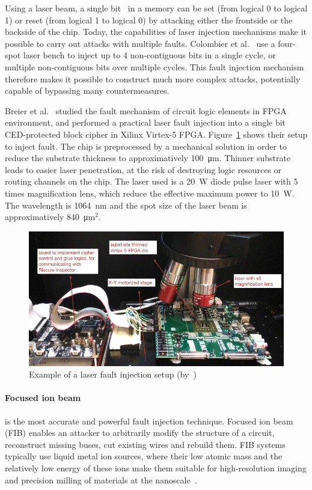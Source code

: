 Using a laser beam, a single bit~\cite{CMDMRD-19-host} in a memory can be set (from logical 0 to logical 1) or reset (from logical 1 to logical 0) by attacking either the frontside or the backside of the chip.
Today, the capabilities of laser injection mechanisms make it possible to carry out attacks with multiple faults.
Colombier et al.~\cite{CGVCBLC-22-cardis} use a four-spot laser bench to inject up to 4 non-contiguous bits in a single cycle, or multiple non-contiguous bits over multiple cycles. This fault injection mechanism therefore makes it possible to construct much more complex attacks, potentially capable of bypassing many countermeasures.

Breier et al.~\cite{JHJBC-17-hss} studied the fault mechanism of circuit logic elements in FPGA environment, and performed a practical laser fault injection into a single bit CED-protected block cipher in Xilinx Virtex-5 FPGA.
Figure~\ref{fig:lfi_setup} shows their setup to inject fault.
The chip is preprocessed by a mechanical solution in order to reduce the substrate thickness to approximatively \SI{100}{\micro\metre}. Thinner substrate leads to easier laser penetration, at the risk of destroying logic resources or routing channels on the chip.
The laser used is a \SI{20}{\watt} diode pulse laser with 5 times magnification lens, which reduce the effective maximum power to \SI{10}{\watt}. The wavelength is \SI{1064}{\nano\metre} and the spot size of the laser beam is approximatively \SI{840}{\micro\metre}$^2$.

\begin{figure}[ht]
    \centering
    \includegraphics[width=\textwidth]{c2_soa/img/lfi_setup.png}
    \caption{Example of a laser fault injection setup (by~\cite{JHJBC-17-hss})}
    \label{fig:lfi_setup}
\end{figure}

\paragraph{Focused ion beam} is the most accurate and powerful fault injection technique. Focused ion beam (FIB) enables an attacker to arbitrarily modify the structure of a circuit, reconstruct missing buses, cut existing wires and rebuild them. FIB systems typically use liquid metal ion sources, where their low atomic mass and the relatively low energy of these ions make them suitable for high-resolution imaging and precision milling of materials at the nanoscale~\cite{FVMBMWP-23-wfiot}.

